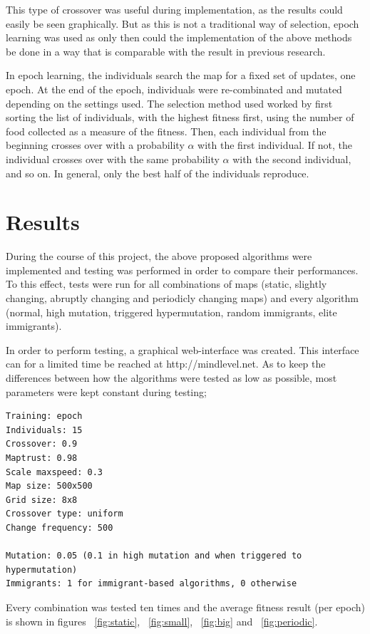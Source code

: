 \documentclass[a4paper,12pt]{article}
\begin{document}
This type of crossover was useful during implementation, as the results could easily be seen graphically. But as this is not a traditional way of selection, epoch learning was used as only then could the implementation of the above methods be done in a way that is comparable with the result in previous research.

In epoch learning, the individuals search the map for a fixed set of updates, one epoch. At the end of the epoch, individuals were re-combinated and mutated depending on the settings used. The selection method used worked by first sorting the list of individuals, with the highest fitness first, using the number of food collected as a measure of the fitness. Then, each individual from the beginning crosses over with a probability $\alpha$ with the first individual. If not, the individual crosses over with the same probability $\alpha$ with the second individual, and so on. In general, only the best half of the individuals reproduce.

\section{Results}
During the course of this project, the above proposed algorithms were implemented and testing was performed in order to compare their performances. To this effect, tests were run for all combinations of maps (static, slightly changing, abruptly changing and periodicly changing maps) and every algorithm (normal, high mutation, triggered hypermutation, random immigrants, elite immigrants).

In order to perform testing, a graphical web-interface was created. This interface can for a limited time be reached at http://mindlevel.net. As to keep the differences between how the algorithms were tested as low as possible, most parameters were kept constant during testing;

\begin{lstlisting}
Training: epoch
Individuals: 15
Crossover: 0.9
Maptrust: 0.98
Scale maxspeed: 0.3
Map size: 500x500
Grid size: 8x8
Crossover type: uniform
Change frequency: 500

Mutation: 0.05 (0.1 in high mutation and when triggered to hypermutation)
Immigrants: 1 for immigrant-based algorithms, 0 otherwise
\end{lstlisting}

Every combination was tested ten times and the average fitness result (per epoch) is shown in figures ~\ref{fig:static}, ~\ref{fig:small}, ~\ref{fig:big} and ~\ref{fig:periodic}.
\end{document}
